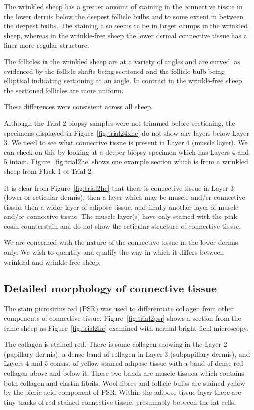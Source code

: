 \documentclass[titlepage]{article}  %
\begin{document}


The wrinkled sheep has a greater amount of staining in the  connective tissue in the lower dermis below the deepest follicle bulbs and to some extent in between the deepest bulbs. The staining also seems to be in larger clumps in the wrinkled sheep, whereas in the wrinkle-free sheep the lower dermal connective tissue has a finer more regular structure. 

  The follicles in the wrinkled sheep are at a variety of angles and are curved, as evidenced by the follicle shafts being sectioned and the follicle bulb being elliptical indicating sectioning at an angle. In contrast in the wrinkle-free sheep the sectioned follicles are more uniform. 

These differences were consistent across all sheep.

Although the Trial 2 biopsy samples were not trimmed before sectioning, the specimens displayed in Figure~\ref{fig:trial24xhe} do not show any layers below Layer 3. We need to see what connective tissue is present in Layer 4 (muscle layer). 
  We can check on this by looking at a deeper biopsy specimen which has Layers 4 and 5 intact.   Figure~\ref{fig:trial2he} shows one example section which is from a wrinkled sheep from Flock 1 of Trial 2.


It is clear from Figure~\ref{fig:trial2he} that there is connective tissue in Layer 3 (lower or reticular dermis), then a layer which may be muscle and/or connective tissue, then a wider layer of adipose tissue, and finally another layer of muscle and/or connective tissue.  The muscle layer(s) have only stained with the pink eosin counterstain and do not show the reticular structure of  connective tissue. 

We are concerned with the nature of the connective tissue in the lower dermis only. We wish to quantify and qualify the way in which it differs between wrinkled and wrinkle-free sheep.

\subsection{Detailed morphology of connective tissue} 
The stain picrosirius red (PSR) was used to differentiate collagen from other components of connective tissue. Figure~\ref{fig:trial2psr} shows a section from the same sheep as Figure~\ref{fig:trial2he} examined with normal bright field microscopy. 

The collagen is stained red. There is some collagen showing in the Layer 2 (papillary dermis), a dense band of collagen in Layer 3 (subpapillary dermis), and Layers 4 and 5 consist of yellow stained adipose tissue with a band of dense red collagen above and below it. These two bands are muscle tissuea which contains both collagen and elastin fibrils.  Wool fibres and follicle bulbs are stained yellow by the picric acid component of PSR. Within the  adipose tissue layer there are tiny tracks of red stained connective tissue, presumably between the fat cells.
\end{document}
